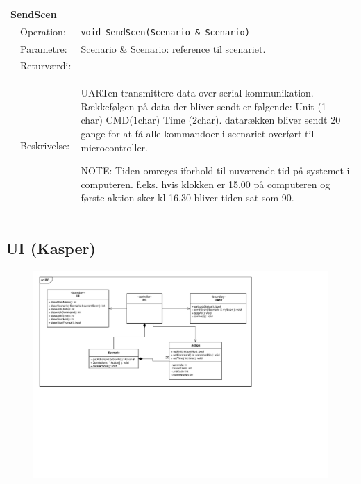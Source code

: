 \begin{table}[h]
\begin{tabularx}{\textwidth}{p{0.6 cm} l X} %
\multicolumn{3}{l}{\textbf{SendScen}}\\
& Operation: & 
\texttt{void SendScen(Scenario \& Scenario)}
\\ & Parametre: & 
 Scenario \& Scenario: reference til scenariet.
\\ & Returværdi: & 
-
\\ & Beskrivelse: & 
UARTen transmittere data over serial kommunikation. Rækkefølgen på data der bliver sendt er følgende:
Unit (1 char) \- CMD(1char) \- Time (2char).
datarækken bliver sendt 20 gange for at få alle kommandoer i scenariet overført til microcontroller. 		

NOTE: Tiden omreges iforhold til nuværende tid på systemet i computeren.
f.eks. hvis klokken er 15.00 på computeren og første aktion sker kl 16.30 bliver tiden sat som 90.

\\ \end{tabularx}
\end{table}

\clearpage

\subsection{UI (Kasper)}
 
\begin{figure}[h]
\centering
\includegraphics[scale=1,clip=true, trim=38 433 625 50]{../Projektdokumentation/Systemarkitektur/diagrammer/PC_KlasseDiagram} %
\end{figure}


